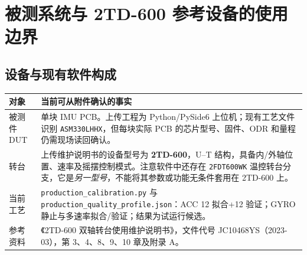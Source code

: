\chapter{被测系统与 2TD-600 参考设备的使用边界}
\section{设备与现有软件构成}
\noindent\begin{tabularx}{\textwidth}{p{31mm}Y}
\toprule
对象 & 当前可从附件确认的事实\\\midrule
被测件 DUT & 单块 IMU PCB。上传工程为 Python/PySide6 上位机；现有工艺文件识别 \texttt{ASM330LHHX}，但每块实际 PCB 的芯片型号、固件、ODR 和量程仍需现场读回确认。\\
转台 & 上传维护说明书的设备型号为 \textbf{2TD-600}，U--T 结构，具备内/外轴位置、速率及摇摆控制模式。注意软件中还存在 \texttt{2FDT600WK} 温控转台分支，它是\emph{另一型号}，不能将其参数或功能无条件套用在 2TD-600 上。\\
当前工艺 & \texttt{production\_calibration.py} 与 \texttt{production\_quality\_profile.json}：ACC 12 拟合+12 验证；GYRO 静止与多速率拟合/验证；结果为试运行候选。\\
参考资料 & 《2TD-600 双轴转台使用维护说明书》，文件代号 JC10468YS（2023-03），第 3、4、8、9、10 章及附录 A。\\\bottomrule
\end{tabularx}
